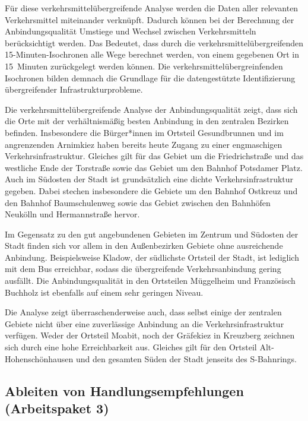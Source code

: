 Für diese verkehrsmittelübergreifende Analyse werden die Daten aller relevanten Verkehrsmittel miteinander verknüpft. Dadurch können bei der Berechnung der Anbindungsqualität Umstiege und Wechsel zwischen Verkehrsmitteln berücksichtigt werden. Das Bedeutet, dass durch die verkehrsmittelübergreifenden 15-Minuten-Isochronen alle Wege berechnet werden, von einem gegebenen Ort in 15~Minuten zurückgelegt werden können. Die verkehrsmittelübergreinfenden Isochronen bilden demnach die Grundlage für die datengestützte Identifizierung übergreifender Infrastrukturprobleme.


Die verkehrsmittelübergreifende Analyse der Anbindungsqualität zeigt, dass sich die Orte mit der verhältnismäßig besten Anbindung in den zentralen Bezirken befinden. Insbesondere die Bürger*innen im Ortsteil Gesundbrunnen und im angrenzenden Arnimkiez haben bereits heute Zugang zu einer engmaschigen Verkehrsinfrastruktur. Gleiches gilt für das Gebiet um die Friedrichstraße und das westliche Ende der Torstraße sowie das Gebiet um den Bahnhof Potsdamer Platz. Auch im Südosten der Stadt ist grundsätzlich eine dichte Verkehrsinfrastruktur gegeben. Dabei stechen insbesondere die Gebiete um den Bahnhof Ostkreuz und den Bahnhof Baumschulenweg sowie das Gebiet zwischen den Bahnhöfen Neukölln und Hermannstraße hervor.

Im Gegensatz zu den gut angebundenen Gebieten im Zentrum und Südosten der Stadt finden sich vor allem in den Außenbezirken Gebiete ohne ausreichende Anbindung. Beispielsweise Kladow, der südlichste Ortsteil der Stadt, ist lediglich mit dem Bus erreichbar, sodass die übergreifende Verkehrsanbindung gering ausfällt. Die Anbindungsqualität in den Ortsteilen Müggelheim und Französisch Buchholz ist ebenfalls auf einem sehr geringen Niveau.

Die Analyse zeigt überraschenderweise auch, dass selbst einige der zentralen Gebiete nicht über eine zuverlässige Anbindung an die Verkehrsinfrastruktur verfügen. Weder der Ortsteil Moabit, noch der Gräfekiez in Kreuzberg zeichnen sich durch eine hohe Erreichbarkeit aus. Gleiches gilt für den Ortsteil Alt-Hohenschönhausen und den gesamten Süden der Stadt jenseits des S-Bahnrings.

\subsection{Ableiten von Handlungsempfehlungen (Arbeitspaket 3)}
\label{ableiten_von_handlungsempfehlungen_arbeitspaket_3}

